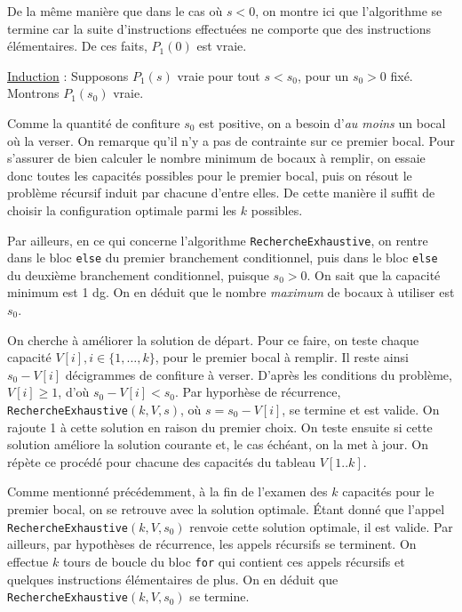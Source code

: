\documentclass[12pt,a4paper]{article}
\begin{document}
De la m\^eme mani\`ere que dans le cas o\`u $s<0$, on montre ici que l'algorithme se termine car la suite d'instructions effectu\'ees ne comporte que des instructions \'el\'ementaires.
De ces faits, $P_{1}(0)$ est vraie.

\medskip
\underline{Induction} : Supposons \( P_{1}(s) \) vraie pour tout \( s < s_0 \), pour un $s_0>0$ fix\'e. Montrons \( P_{1}(s_0) \) vraie.

Comme la quantit\'e de confiture $s_0$ est positive, on a besoin d'{\itshape au moins} un bocal o\`u la verser. On remarque qu'il n'y a pas de contrainte sur ce premier bocal. Pour s'assurer de bien calculer le nombre minimum de bocaux \`a remplir, on essaie donc toutes les capacit\'es possibles pour le premier bocal, puis on r\'esout le probl\`eme r\'ecursif induit par chacune d'entre elles. De cette mani\`ere il suffit de choisir la configuration optimale parmi les $k$ possibles.

Par ailleurs, en ce qui concerne l'algorithme \texttt{RechercheExhaustive}, on rentre dans le bloc \texttt{else} du premier branchement conditionnel, puis dans le bloc \texttt{else} du deuxi\`eme branchement conditionnel, puisque $s_0 > 0$. On sait que la capacit\'e minimum est 1 \si{dg}. On en d\'eduit que le nombre {\itshape maximum} de bocaux \`a utiliser est $s_0$. 

On cherche \`a am\'eliorer la solution de d\'epart. Pour ce faire, on teste chaque capacit\'e $V[i], i \in \{1, \dotsc, k \}$, pour le premier bocal \`a remplir. Il reste ainsi $s_0-V[i]$ d\'ecigrammes de confiture \`a verser. D'apr\`es les conditions du probl\`eme, $V[i] \geq 1$, d'o\`u $s_0-V[i] < s_0$. Par hyporh\`ese de r\'ecurrence, \texttt{RechercheExhaustive}$(k,V,s)$, o\`u $s=s_0-V[i]$, se termine et est valide. On rajoute 1 \`a cette solution en raison du premier choix. On teste ensuite si cette solution am\'eliore la solution courante et, le cas \'ech\'eant, on la met \`a jour. On r\'ep\`ete ce proc\'ed\'e pour chacune des capacit\'es du tableau $V[1..k]$. 

Comme mentionn\'e pr\'ec\'edemment, \`a la fin de l'examen des $k$ capacit\'es pour le premier bocal, on se retrouve avec la solution optimale. 
\'Etant donn\'e que l'appel \texttt{RechercheExhaustive}$(k, V, s_0)$ renvoie cette solution optimale, il est valide. 
Par ailleurs, par hypoth\`eses de r\'ecurrence, les appels r\'ecursifs se terminent. On effectue $k$ tours de boucle du bloc \texttt{for} qui contient ces appels r\'ecursifs et quelques instructions \'el\'ementaires de plus.
On en d\'eduit que \texttt{RechercheExhaustive}$(k, V, s_0)$ se termine.
\end{document}

